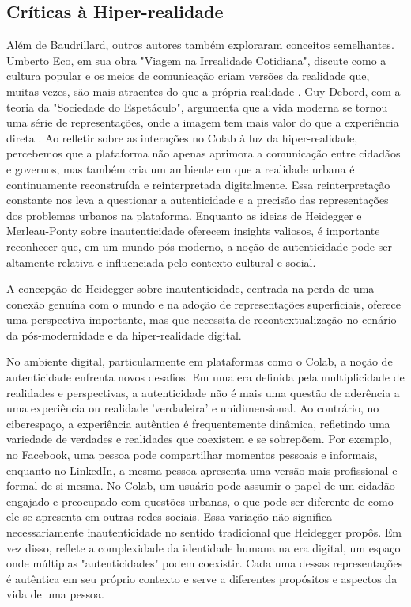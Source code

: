 \subsection*{Críticas à Hiper-realidade}

Além de Baudrillard, outros autores também exploraram conceitos semelhantes. Umberto Eco, em sua obra "Viagem na Irrealidade Cotidiana", discute como a cultura popular e os meios de comunicação criam versões da realidade que, muitas vezes, são mais atraentes do que a própria realidade \cite{1993_Eco_BOOK}. Guy Debord, com a teoria da "Sociedade do Espetáculo", argumenta que a vida moderna se tornou uma série de representações, onde a imagem tem mais valor do que a experiência direta \cite{1993_Eco_BOOK}. Ao refletir sobre as interações no Colab à luz da hiper-realidade, percebemos que a plataforma não apenas aprimora a comunicação entre cidadãos e governos, mas também cria um ambiente em que a realidade urbana é continuamente reconstruída e reinterpretada digitalmente. Essa reinterpretação constante nos leva a questionar a autenticidade e a precisão das representações dos problemas urbanos na plataforma. Enquanto as ideias de Heidegger e Merleau-Ponty sobre inautenticidade oferecem insights valiosos, é importante reconhecer que, em um mundo pós-moderno, a noção de autenticidade pode ser altamente relativa e influenciada pelo contexto cultural e social.

A concepção de Heidegger sobre inautenticidade, centrada na perda de uma conexão genuína com o mundo e na adoção de representações superficiais, oferece uma perspectiva importante, mas que necessita de recontextualização no cenário da pós-modernidade e da hiper-realidade digital. 

No ambiente digital, particularmente em plataformas como o Colab, a noção de autenticidade enfrenta novos desafios. Em uma era definida pela multiplicidade de realidades e perspectivas, a autenticidade não é mais uma questão de aderência a uma experiência ou realidade 'verdadeira' e unidimensional. Ao contrário, no ciberespaço, a experiência autêntica é frequentemente dinâmica, refletindo uma variedade de verdades e realidades que coexistem e se sobrepõem. Por exemplo, no Facebook, uma pessoa pode compartilhar momentos pessoais e informais, enquanto no LinkedIn, a mesma pessoa apresenta uma versão mais profissional e formal de si mesma. No Colab, um usuário pode assumir o papel de um cidadão engajado e preocupado com questões urbanas, o que pode ser diferente de como ele se apresenta em outras redes sociais. Essa variação não significa necessariamente inautenticidade no sentido tradicional que Heidegger propôs. Em vez disso, reflete a complexidade da identidade humana na era digital, um espaço onde múltiplas "autenticidades" podem coexistir. Cada uma dessas representações é autêntica em seu próprio contexto e serve a diferentes propósitos e aspectos da vida de uma pessoa.

